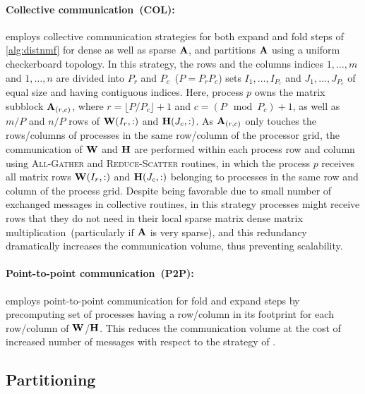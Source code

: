\paragraph{Collective communication~(\textbf{COL}):} 
\mpifaun employs collective communication strategies for both expand and fold steps of \cref{alg:distnmf} for dense as well as sparse $\Am$, and partitions $\Am$ using a uniform checkerboard topology.
In this strategy, the rows and the columns indices $1, \dots, m$ and $1, \dots, n$ are divided into $P_r$ and $P_c$~($P = P_r P_c$) sets $I_1, \dots, I_{P_r}$ and $J_1, \dots, J_{P_c}$ of equal size and having contiguous indices.
Here, process $p$ owns the matrix subblock $\Am_{(r, c)}$, where $r = \lfloor P/P_c \rfloor + 1$ and $c = (P \mod P_c) + 1$, as well as $m / P$ and $n / P$ rows of $\Wm(I_r, :)$ and $\Hm(J_c, :)$.  
As $\Am_{(r, c)}$ only touches the rows/columns of processes in the same row/column of the processor grid, the communication of $\WW$ and $\HH$ are performed within each process row and column using \textsc{All-Gather} and \textsc{Reduce-Scatter} routines, in which the process $p$ receives all matrix rows $\Wm(I_r, :)$ and $\Hm(J_c, :)$ belonging to processes in the same row and column of the process grid.
Despite being favorable due to small number of exchanged messages in collective routines, in this strategy processes might receive rows that they do not need in their local sparse matrix dense matrix multiplication~(particularly if $\AA$ is very sparse), and this redundancy dramatically increases the communication volume, thus preventing scalability. 

\paragraph{Point-to-point communication~(\textbf{P2P}):} 
\hypertensor employs point-to-point communication for fold and expand steps by precomputing set of processes having a row/column in its footprint for each row/column of $\WW$/$\HH$.
This reduces the communication volume at the cost of increased number of messages with respect to the strategy of \mpifaun.



\subsection{Partitioning}

